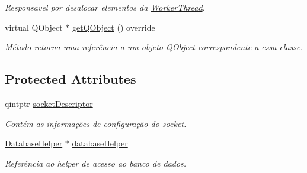 \begin{DoxyCompactItemize}
\begin{DoxyCompactList}\small\item\em Responsavel por desalocar elementos da \hyperlink{classWorkerThread}{Worker\+Thread}. \end{DoxyCompactList}\item 
virtual Q\+Object $\ast$ \hyperlink{classWorkerThreadImpl_a30689eaffcb664bc95644bf497ea1446}{get\+Q\+Object} () override
\begin{DoxyCompactList}\small\item\em Método retorna uma referência a um objeto Q\+Object correspondente a essa classe. \end{DoxyCompactList}\end{DoxyCompactItemize}
\subsection*{Protected Attributes}
\begin{DoxyCompactItemize}
\item 
qintptr \hyperlink{classWorkerThreadImpl_af3d6cf4437a92a4dbdf8c07a474a671b}{socket\+Descriptor}\hypertarget{classWorkerThreadImpl_af3d6cf4437a92a4dbdf8c07a474a671b}{}\label{classWorkerThreadImpl_af3d6cf4437a92a4dbdf8c07a474a671b}

\begin{DoxyCompactList}\small\item\em Contém as informações de configuração do socket. \end{DoxyCompactList}\item 
\hyperlink{classDatabaseHelper}{Database\+Helper} $\ast$ \hyperlink{classWorkerThreadImpl_a6a64f8daf91e56abf94c5a92bfc0fb88}{database\+Helper}\hypertarget{classWorkerThreadImpl_a6a64f8daf91e56abf94c5a92bfc0fb88}{}\label{classWorkerThreadImpl_a6a64f8daf91e56abf94c5a92bfc0fb88}

\begin{DoxyCompactList}\small\item\em Referência ao helper de acesso ao banco de dados. \end{DoxyCompactList}\end{DoxyCompactItemize}
